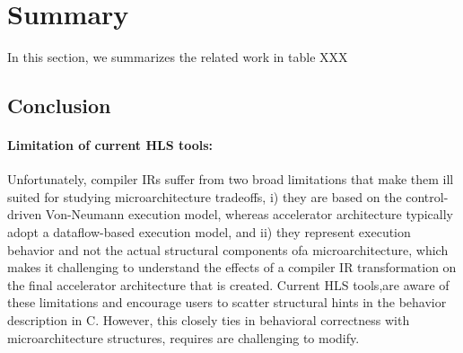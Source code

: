 
\section{Summary}


In this section, we summarizes the related work in table XXX

\subsection{Conclusion} 
\paragraph{Limitation of current HLS tools:}
Unfortunately, compiler IRs suffer from two broad limitations that make them ill suited for studying microarchitecture tradeoffs, i) they are based on the control-driven Von-Neumann execution  model,  whereas  accelerator  architecture  typically adopt a dataflow-based execution model, and ii) they represent execution behavior and not the actual structural components ofa microarchitecture, which makes it challenging to understand the  effects  of  a  compiler  IR  transformation  on  the  final accelerator  architecture  that  is  created.
 Current  HLS  tools,are aware of these limitations and encourage users to scatter structural hints in the behavior description in C. However, this closely ties in behavioral correctness with microarchitecture structures, requires are challenging to modify.